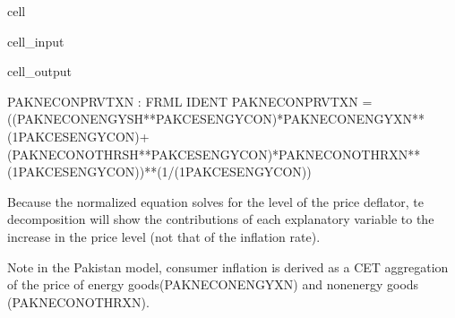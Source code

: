 \documentclass[letterpaper,10pt,english]{jupyterBook}
\begin{document}
\begin{sphinxuseclass}{cell}\begin{sphinxVerbatimInput}

\begin{sphinxuseclass}{cell_input}
\begin{sphinxVerbatim}[commandchars=\\\{\}]
\PYG{p}{[}\PYG{p}{]}
\end{sphinxVerbatim}

\end{sphinxuseclass}\end{sphinxVerbatimInput}
\begin{sphinxVerbatimOutput}

\begin{sphinxuseclass}{cell_output}
\begin{sphinxVerbatim}[commandchars=\\\{\}]
PAKNECONPRVTXN : FRML \PYGZlt{}IDENT\PYGZgt{} PAKNECONPRVTXN = ((PAKNECONENGYSH**PAKCESENGYCON)*PAKNECONENGYXN**(1\PYGZhy{}PAKCESENGYCON)+(PAKNECONOTHRSH**PAKCESENGYCON)*PAKNECONOTHRXN**(1\PYGZhy{}PAKCESENGYCON))**(1/(1\PYGZhy{}PAKCESENGYCON)) \PYGZdl{}
\end{sphinxVerbatim}

\end{sphinxuseclass}\end{sphinxVerbatimOutput}

\end{sphinxuseclass}
\sphinxAtStartPar
Because the normalized equation solves for the level of the price deflator, te decomposition will show the contributions of each explanatory variable to the increase in the price level (not that of the inflation rate).

\sphinxAtStartPar
Note in the Pakistan model, consumer inflation is derived as a CET aggregation of the price of energy goods(PAKNECONENGYXN) and non\sphinxhyphen{}energy goods (PAKNECONOTHRXN).
\end{document}
